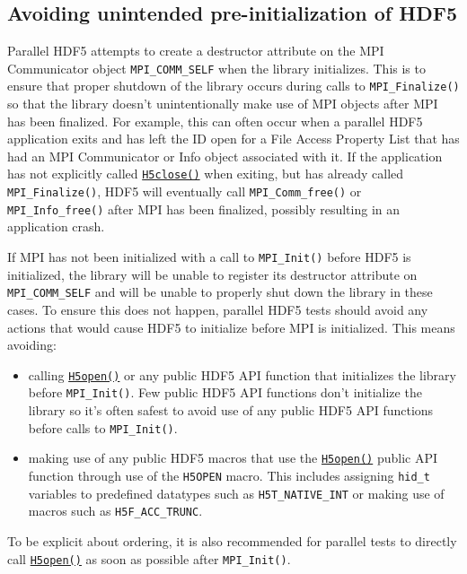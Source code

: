 \documentclass[../HDF5_RFC.tex]{subfiles}
\begin{document}
\subsection{Avoiding unintended pre-initialization of HDF5}

Parallel HDF5 attempts to create a destructor attribute on the MPI Communicator object
\texttt{MPI\_COMM\_SELF} when the library initializes. This is to ensure that proper shutdown of the
library occurs during calls to \texttt{MPI\_Finalize()} so that the library doesn't unintentionally make
use of MPI objects after MPI has been finalized. For example, this can often occur when a parallel HDF5 application exits and has left the ID open for a File Access Property List that has had an MPI Communicator
or Info object associated with it. If the application has not explicitly called
\href{https://support.hdfgroup.org/documentation/hdf5/latest/group___h5.html#ga8a9fe81dcf66972ed75ea481e7750574}{\texttt{H5close()}} when exiting, but has already
called \texttt{MPI\_Finalize()}, HDF5 will eventually call \texttt{MPI\_Comm\_free()} or
\texttt{MPI\_Info\_free()} after MPI has been finalized, possibly resulting in an application crash.

If MPI has not been initialized with a call to \texttt{MPI\_Init()} before HDF5 is initialized, the library
will be unable to register its destructor attribute on \texttt{MPI\_COMM\_SELF} and will be unable to
properly shut down the library in these cases. To ensure this does not happen, parallel HDF5 tests should
avoid any actions that would cause HDF5 to initialize before MPI is initialized. This means avoiding:

\begin{itemize}

    \item calling \href{https://support.hdfgroup.org/documentation/hdf5/latest/group___h5.html#ga27fa33dc262dda95c5aa8df533837480}{\texttt{H5open()}} or any public HDF5 API function
          that initializes the library before \texttt{MPI\_Init()}. Few public HDF5 API functions don't initialize the library so it's often safest to avoid use of any public HDF5 API functions before calls to \texttt{MPI\_Init()}.
    \item making use of any public HDF5 macros that use the \href{https://support.hdfgroup.org/documentation/hdf5/latest/group___h5.html#ga27fa33dc262dda95c5aa8df533837480}{\texttt{H5open()}} public API function
          through use of the \texttt{H5OPEN} macro. This includes assigning \texttt{hid\_t} variables to predefined datatypes such as \texttt{H5T\_NATIVE\_INT} or making use of macros such as
          \texttt{H5F\_ACC\_TRUNC}.

\end{itemize}

To be explicit about ordering, it is also recommended for parallel tests to directly call
\href{https://support.hdfgroup.org/documentation/hdf5/latest/group___h5.html#ga27fa33dc262dda95c5aa8df533837480}{\texttt{H5open()}} as soon as possible after \texttt{MPI\_Init()}.
\end{document}
